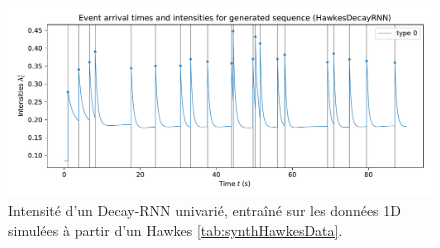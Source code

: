 \documentclass[../main.tex]{subfiles}
\begin{document}
\begin{figure}[ht]
	\includegraphics[width=\linewidth]{../results/intensity_HawkesDecayRNN_1d_hidden64_20181206-234848.pdf}
	\caption{Intensité d'un Decay-RNN univarié, entraîné sur les données 1D simulées à partir d'un Hawkes \autoref{tab:synthHawkesData}.}\label{fig:1DRNNintensityPlot}
\end{figure}
\end{document}
